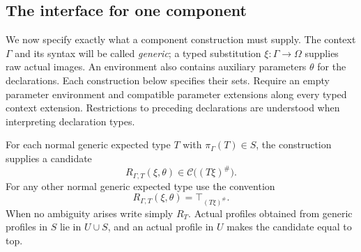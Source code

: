 \subsection{The interface for one component}
\label{subsec:candidate-interface}

We now specify exactly what a component construction must supply.
The context $\Gamma$ and its syntax will be called \emph{generic};
a typed substitution $\xi:\Gamma\to\Omega$ supplies raw actual
images. An environment also contains auxiliary parameters $\theta$
for the declarations. Each construction below specifies their sets.
Require an empty parameter environment and compatible parameter
extensions along every typed context extension. Restrictions to
preceding declarations are understood when interpreting declaration
types.

For each normal generic expected type $T$ with
$\pi_\Gamma(T)\in S$, the construction supplies a candidate
\[
       R_{\Gamma,T}(\xi,\theta)
                     \in\mathcal C\bigl((T\xi)^\#\bigr).
\]
For any other normal generic expected type use the convention
\[
              R_{\Gamma,T}(\xi,\theta)=\top_{(T\xi)^\#}.
\]
When no ambiguity arises write simply $R_T$. Actual profiles obtained
from generic profiles in $S$ lie in $U\cup S$, and an actual profile
in $U$ makes the candidate equal to top.

